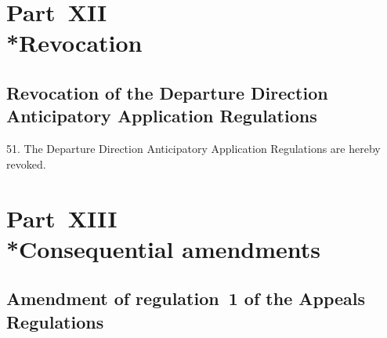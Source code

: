 \documentclass[12pt,a4paper]{article}
\begin{document}

\section[Part~XII --- Revocation]{Part~XII\\*Revocation}

\renewcommand\parthead{--- Part~XII}

\subsection[51. Revocation of the Departure Direction Anticipatory Application
Regulations]{Revocation of the Departure Direction Anticipatory Application
Regulations}

51. The Departure Direction Anticipatory Application Regulations are
hereby revoked.

\section[Part~XIII --- Consequential amendments]{Part~XIII\\*Consequential amendments}

\renewcommand\parthead{--- Part~XIII}

\subsection[52. Amendment of regulation~1 of the Appeals
Regulations]{Amendment of regulation~1 of the Appeals
Regulations}
\end{document}
